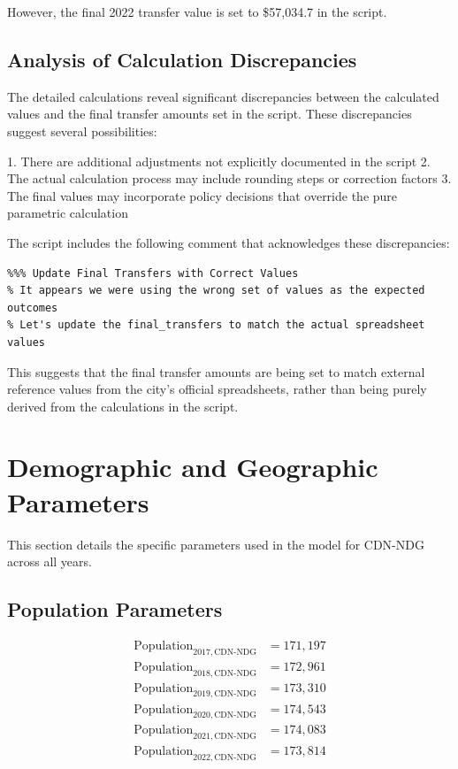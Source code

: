 \documentclass{article}
\begin{document}
However, the final 2022 transfer value is set to \$57,034.7 in the script.

\subsection{Analysis of Calculation Discrepancies}

The detailed calculations reveal significant discrepancies between the calculated values and the final transfer amounts set in the script. These discrepancies suggest several possibilities:

1. There are additional adjustments not explicitly documented in the script
2. The actual calculation process may include rounding steps or correction factors
3. The final values may incorporate policy decisions that override the pure parametric calculation

The script includes the following comment that acknowledges these discrepancies:

\begin{verbatim}
%%% Update Final Transfers with Correct Values
% It appears we were using the wrong set of values as the expected outcomes
% Let's update the final_transfers to match the actual spreadsheet values
\end{verbatim}

This suggests that the final transfer amounts are being set to match external reference values from the city's official spreadsheets, rather than being purely derived from the calculations in the script.

\section{Demographic and Geographic Parameters}

This section details the specific parameters used in the model for CDN-NDG across all years.

\subsection{Population Parameters}

\begin{align}
\text{Population}_{2017,\text{CDN-NDG}} &= 171,197\\
\text{Population}_{2018,\text{CDN-NDG}} &= 172,961\\
\text{Population}_{2019,\text{CDN-NDG}} &= 173,310\\
\text{Population}_{2020,\text{CDN-NDG}} &= 174,543\\
\text{Population}_{2021,\text{CDN-NDG}} &= 174,083\\
\text{Population}_{2022,\text{CDN-NDG}} &= 173,814
\end{align}
\end{document}
